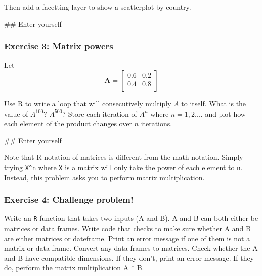\documentclass[]{book}
\newenvironment{Shaded}{\begin{snugshade}}{\end{snugshade}}
\newcommand{\NormalTok}[1]{#1}
\theoremstyle{definition}
\theoremstyle{definition}
\theoremstyle{definition}
\theoremstyle{remark}
\begin{document}
Then add a facetting layer to show a scatterplot by country.

\begin{Shaded}
\begin{Highlighting}[]
\NormalTok{## Enter yourself}
\end{Highlighting}
\end{Shaded}

\subsubsection{Exercise 3: Matrix
powers}\label{exercise-3-matrix-powers}

Let \[\mathbf{A} = \left[\begin{array}
{rrr}
0.6 & 0.2\\
0.4 & 0.8\\
\end{array}\right]
\]

Use R to write a loop that will consecutively multiply \(A\) to itself.
What is the value of \(A^{100}\)? \(A^{500}\)? Store each iteration of
\(A^n\) where \(n = 1, 2....\) and plot how each element of the product
changes over \(n\) iterations.

\begin{Shaded}
\begin{Highlighting}[]
\NormalTok{## Enter yourself}
\end{Highlighting}
\end{Shaded}

Note that R notation of matrices is different from the math notation.
Simply trying \texttt{X\^{}n} where \texttt{X} is a matrix will only
take the power of each element to \texttt{n}. Instead, this problem asks
you to perform matrix multiplication.

\subsubsection{Exercise 4: Challenge
problem!}\label{exercise-4-challenge-problem}

Write an \texttt{R} function that takes two inputs (A and B). A and B
can both either be matrices or data frames. Write code that checks to
make sure whether A and B are either matrices or dateframe. Print an
error message if one of them is not a matrix or data frame. Convert any
data frames to matrices. Check whether the A and B have compatible
dimensions. If they don't, print an error message. If they do, perform
the matrix multiplication A * B.
\end{document}
